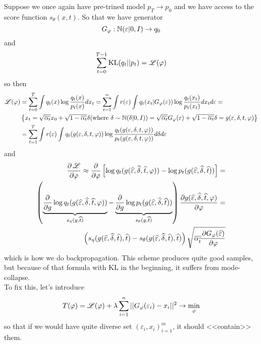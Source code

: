 Suppose we once again have pre-trined model $p_T \to p_0$ and we have access to the score function $s_\theta(x, t)$. So that we have generator
\[ 
    G_\varphi : \operatorname{\mathbb{N}}(\varepsilon | 0, I) \to q_0
\]
and 
\[
    \sum_{t = 0}^{T - 1} \operatorname{KL}(q_t || p_t) = \operatorname{\mathscr{L}}(\varphi)
\]
so then 
\begin{equation*}
    \begin{aligned}
        \operatorname{\mathscr{L}} (\varphi) &= \sum_{t = 0}^{T} \int q_t(x) \log \frac{q_t(x)}{p_t(x)} d x_t = \sum_{t = 1}^n \int r(\varepsilon) \int q_t(x_t | G_\varphi(\varepsilon)) \log \frac{q_t(x_t)}{p_t(x_t)} d x_t d \varepsilon = \\ 
        &\left\{ x_t = \sqrt{\overline{\alpha_t}} x_0 + \sqrt{1 - \overline{\alpha_t}} \delta (\text{where } \delta \sim \operatorname{\mathbb{N}}(\delta | 0, I)) = \sqrt{\overline{\alpha_t}} G_\varphi(\varepsilon) + \sqrt{1 - \overline{\alpha_t}} \delta = g(\varepsilon, \delta, t, \varphi)\right\} \\
        &= \sum_{t = 1}^T \int r(\varepsilon) \int q_t(g(\varepsilon, \delta, t, \varphi)) \log \frac{q_t(g(\varepsilon, \delta, t, \varphi))}{p_t(g(\varepsilon, \delta, t, \varphi))} d \delta d \varepsilon
    \end{aligned}
\end{equation*}
and 
\begin{equation*}
    \begin{aligned}
        \frac{\partial \operatorname{\mathscr{L}}}{\partial \varphi} \approx \frac{\partial}{\partial \varphi} \left[ \log q_t(g(\widehat{\varepsilon}, \widehat{\delta}, \widehat{t}, \varphi)) - \log p_t(g(\widehat{\varepsilon}, \widehat{\delta}, \widehat{t})) \right] = \\ 
        \left( \underbrace{\frac{\partial}{\partial g} \log q_t(g (\widehat{\varepsilon}, \widehat{\delta}, \widehat{t}, \varphi))}_{s_\eta(g, \widehat{t})} - \underbrace{\frac{\partial}{\partial g} \log p_t(g(\widehat{\varepsilon}, \widehat{\delta}, \widehat{t}))}_{s_\theta(g, \widehat{t})} \right) \frac{\partial g (\widehat{\varepsilon}, \widehat{\delta}, \widehat{t}, \varphi)}{\partial \varphi} = \\ 
        \left( s_\eta(g (\widehat{\varepsilon}, \widehat{\delta}, \widehat{t}), \widehat{t}) - s_\theta(g(\widehat{\varepsilon}, \widehat{\delta}, \widehat{t}), \widehat{t}) \right) \sqrt{\overline{\alpha_{\widehat{t}}} \frac{\partial G_\varphi(\widehat{\varepsilon})}{\partial \varphi}}
    \end{aligned}
\end{equation*}
which is how we do backpropagation. This scheme produces quite good samples, but because of that formula with KL in the beginning, it suffers from mode-collapse. \\ 

To fix this, let's introduce 
\[ 
    T(\varphi) = \operatorname{\mathscr{L}}(\varphi) + \lambda \sum_{i = 1}^n || G_\varphi(\varepsilon_i) - x_i ||^2 \to \min_{\varphi}
\]
so that if we would have quite diverse set $(\varepsilon_i, x_i)_{i = 1}^m$, it should <<contain>> them. 

